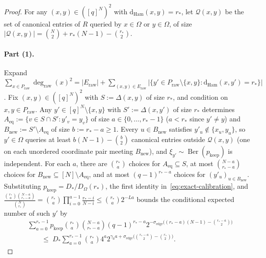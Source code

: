 \documentclass[11pt]{article}
\theoremstyle{definition}
\theoremstyle{remark}
\newcommand{\Ham}{\mathrm{Ham}}
\newcommand{\dHam}{\mathrm{d}_{\Ham}}
\newcommand{\Ber}{\operatorname{Ber}}
\begin{document}
\begin{proof}
For any $(x, y) \in ([q]^N)^2$ with $\dHam(x, y) = r_*$, let $\mathcal{Q}(x, y)$ be the set of canonical entries of $R$ queried by $x \in \Omega$ or $y \in \Omega$, of size $|\mathcal{Q}(x, y)| = \binom{N}{2} + r_*(N - 1) - \binom{r_*}{2}$.

\paragraph{Part (1).}
Expand $\sum_{x \in P_{\mathrm{raw}}} \deg_{\mathrm{raw}}(x)^2 = |E_{\mathrm{raw}}| + \sum_{(x, y) \in E_{\mathrm{raw}}} |\{y' \in P_{\mathrm{raw}} \setminus \{x, y\} : \dHam(x, y') = r_*\}|$. Fix $(x, y) \in ([q]^N)^2$ with $S := \Delta(x, y)$ of size $r_*$, and condition on $x, y \in P_{\mathrm{raw}}$. Any $y' \in [q]^N \setminus \{x, y\}$ with $S' := \Delta(x, y')$ of size $r_*$ determines $A_{\mathrm{eq}} := \{v \in S \cap S' : y'_v = y_v\}$ of size $a \in \{0, \dots, r_* - 1\}$ ($a < r_*$ since $y' \ne y$) and $B_{\mathrm{new}} := S' \setminus A_{\mathrm{eq}}$ of size $b := r_* - a \ge 1$. Every $u \in B_{\mathrm{new}}$ satisfies $y'_u \notin \{x_u, y_u\}$, so $y' \in \Omega$ queries at least $b(N - 1) - \binom{b}{2}$ canonical entries outside $\mathcal{Q}(x, y)$ (one on each unordered coordinate pair meeting $B_{\mathrm{new}}$), and $\xi_{y'} \sim \Ber(p_{\mathrm{keep}})$ is independent. For each $a$, there are $\binom{r_*}{a}$ choices for $A_{\mathrm{eq}} \subseteq S$, at most $\binom{N - a}{r_* - a}$ choices for $B_{\mathrm{new}} \subseteq [N] \setminus A_{\mathrm{eq}}$, and at most $(q - 1)^{r_* - a}$ choices for $(y'_u)_{u \in B_{\mathrm{new}}}$. Substituting $p_{\mathrm{keep}} = D_* / D_\Omega(r_*)$, the first identity in~\eqref{eq:exact-calibration}, and $\frac{\binom{r_*}{a}\binom{N - a}{r_* - a}}{\binom{N}{r_*}} = \binom{r_*}{a}\prod_{i=0}^{a-1}\frac{r_* - i}{N - i} \le \binom{r_*}{a} 2^{-L a}$ bounds the conditional expected number of such $y'$ by
\begin{align*}
&\sum_{a=0}^{r_*-1} p_{\mathrm{keep}} \binom{r_*}{a}\binom{N - a}{r_* - a}(q - 1)^{r_* - a} 2^{-\sigma_{\mathrm{edge}}\bigl((r_* - a)(N - 1) - \binom{r_* - a}{2}\bigr)} \\
&\qquad \le\; D_* \sum_{a=0}^{r_*-1} \binom{r_*}{a} 4^a 2^{\gamma_0 a + \sigma_{\mathrm{edge}}\bigl(\binom{r_* - a}{2} - \binom{r_*}{2}\bigr)}.
\end{align*}

\end{proof}
\end{document}

